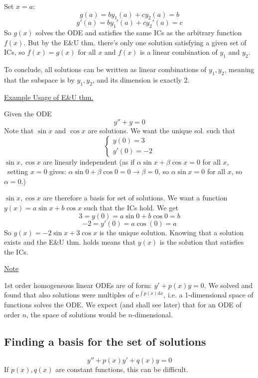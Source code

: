 \documentclass{article}
\newcommand{\mathd}{\mathrm{d}}
\newcommand{\mathe}{\mathrm{e}}
\newcommand{\tmtextbf}[1]{\text{{\bfseries{#1}}}}
\newcommand{\tmtextit}[1]{\text{{\itshape{#1}}}}
\begin{document}
Set $x = a$:
\[ g (a) = by_1 (a) + cy_2 (a) = b \]
\[ g' (a) = by_1' (a) + cy_2' (a) = c \]
So $g (x)$ solves the ODE and satisfies the same ICs as the arbitrary function
$f (x)$. But by the E\&U thm. there's only one solution satisfying a given set
of ICs, so $f (x) = g (x)$ for all $x$ and $f (x)$ is a linear combination of
$y_1$ and $y_2$.

To conclude, all solutions can be written as linear combinations of $y_1,
y_2$, meaning that the subspace is \tmtextit{spanned} by $y_1, y_2$, and its
dimension is exactly 2.

{\underline{Example Usage of E\&U thm.}}

Given the ODE
\[ y'' + y = 0 \]
Note that $\sin x$ and $\cos x$ are solutions. We want the unique sol. such
that
\[ \left\{\begin{array}{l}
     y (0) = 3\\
     y' (0) = - 2
   \end{array}\right. \]
$\sin x, \cos x$ are linearly independent (as if $\alpha \sin x + \beta \cos x
= 0$ for all $x$, \ setting $x = 0$ gives: $\alpha \sin 0 + \beta \cos 0 = 0
\rightarrow \beta = 0$, so $\alpha \sin x = 0$ for all $x$, so $\alpha = 0$.)

$\sin x, \cos x$ are therefore a basis for set of solutions. We want a
function $y (x) = a \sin x + b \cos x$ such that the ICs hold. We get
\[ 3 = y (0) = a \sin 0 + b \cos 0 = b \]
\[ - 2 = y' (0) = a \cos (0) = a \]
So $y (x) = - 2 \sin x + 3 \cos x$ is the unique solution. Knowing that a
solution exists and the E\&U thm. holds means that $y (x)$ is the
\tmtextbf{only} solution that satisfies the ICs.

\begin{tmornamented}
  {\underline{Note}}
  
  1st order homogeneous linear ODEs are of form: $y' + p (x) y = 0$. We solved
  and found that also solutions were multiples of $\mathe^{\int p (x) \mathd
  x}$, i.e. a 1-dimensional space of functions solves the ODE. We expect (and
  shall see later) that for an ODE of order $n$, the space of solutions would
  be $n$-dimensional.
\end{tmornamented}

\subsection{Finding a basis for the set of solutions}

\[ y'' + p (x) y' + q (x) y = 0 \]
If $p (x), q (x)$ are \tmtextbf{not} constant functions, this can be
difficult.
\end{document}
